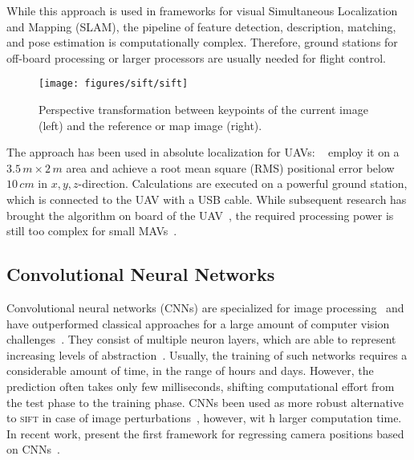 \documentclass{report}
\begin{document}

While this approach is used in frameworks for visual Simultaneous
Localization and Mapping (SLAM), the pipeline of feature detection,
description, matching, and pose estimation is computationally
complex. Therefore, ground stations for off-board processing or larger
processors are usually needed for flight control.


\begin{figure}[h!]
\begin{center}
\texttt{[image: figures/sift/sift]}
\caption{{Perspective transformation between keypoints of the current image (left) and the reference or map image (right).%
}}
\end{center}
\end{figure}

The approach has been used in absolute localization for UAVs:
\citeauthor{blosch2010vision}~\cite{blosch2010vision} employ it on a
$3.5\,m \times 2\,m$ area and achieve a root mean square (RMS)
positional error below $10\,cm$ in $x,y,z$-direction. Calculations are
executed on a powerful ground station, which is connected to the UAV
with a USB cable. While subsequent research has brought the algorithm
on board of the UAV~\cite{achtelik2011onboard}, the required processing power is still too complex for
small MAVs~\cite{de2009design}.

\subsection{Convolutional Neural Networks}

Convolutional neural networks (CNNs) are specialized for image
processing~\cite{lecun1998gradient} and have outperformed classical
approaches for a large amount of computer vision
challenges~\cite{dosovitskiy2014discriminative}. They consist of
multiple neuron layers, which are able to represent increasing levels
of abstraction~\cite{lecun1998gradient}. Usually, the training of such
networks requires a considerable amount of time, in the range of hours
and days. However, the prediction often takes only few milliseconds,
shifting computational effort from the test phase to the training
phase. CNNs been used as more robust alternative to \textsc{sift} in
case of image perturbations~\cite{dosovitskiy2014discriminative},
however, wit h larger computation time. In recent work,
\citeauthor{kendall2015posenet} present the first framework for
regressing camera positions based on
CNNs~\cite{kendall2015posenet}.
\end{document}
